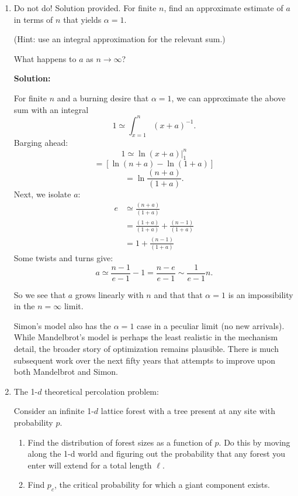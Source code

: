 \begin{enumerate}

   \solutionend

\item
  Do not do! Solution provided.
  For finite $n$, find an approximate estimate of $a$
  in terms of $n$ that yields $\alpha=1$.

  (Hint: use an integral approximation for the relevant sum.)

  What happens to $a$ as $n \rightarrow \infty$?

  \textbf{Solution:}

  For finite $n$ and a burning desire that $\alpha=1$, we 
  can approximate the above sum with an integral
  $$ 
  1 \simeq \int_{x=1}^n (x+a)^{-1}.
  $$
  Barging ahead:
  $$ 
  1 \simeq 
  \left.
  \ln{(x+a)}
  \right|_{1}^{n}
  $$
  $$
  =
  \left[
    \ln{(n+a)}
    -
    \ln{(1+a)}
    \right]
  $$
  $$
  =
  \ln{\frac{(n+a)}{(1+a)}}.
  $$
  Next, we isolate $a$:
  \begin{align*}
    e 
    &
    \simeq
    \frac{(n+a)}{(1+a)} 
    \\
    &
    = 
    \frac{(1+a)}{(1+a)} 
    +
    \frac{(n-1)}{(1+a)} 
    \\
    & = 
    1 
    +
    \frac{(n-1)}{(1+a)} 
  \end{align*}
  Some twists and turns give:
  $$
  a \simeq
  \frac{n-1}{e-1} - 1
  =
  \frac{n-e}{e-1}
  \sim 
  \frac{1}{e-1} n.
  $$

  So we see that $a$ grows linearly with $n$ and that
  that $\alpha=1$ is an impossibility in the $n = \infty$ limit.

  Simon's model also has the $\alpha=1$ case in a peculiar
  limit (no new arrivals).  
  While Mandelbrot's model is perhaps
  the least realistic in the mechanism detail, the broader
  story of optimization remains plausible.  
  There is much subsequent work 
  over the next fifty years that attempts to improve upon
  both Mandelbrot and Simon.



\item
  
  The 1-$d$ theoretical percolation problem:

  Consider an infinite 1-$d$ lattice forest with 
  a tree present at any site with probability $p$.

  \begin{enumerate}
  \item 
    Find the distribution of forest sizes
    as a function of $p$.
    Do this by moving along the 1-d world and
    figuring out 
    the probability
    that any forest you enter will extend for a total length $\ell$.
  \item 
    Find $p_c$, the critical probability for
    which a giant component exists.


\end{enumerate}
\end{enumerate}
